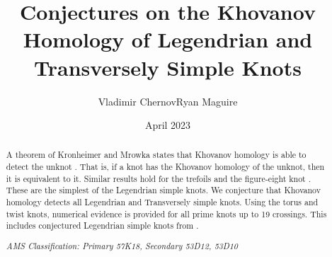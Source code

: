 \documentclass{article}
\title{Conjectures on the Khovanov Homology of Legendrian
       and Transversely Simple Knots}
\author{Vladimir Chernov\hspace{2em}Ryan Maguire}
\date{April 2023}
\theoremstyle{plain}
\begin{document}
    \maketitle
    \tableofcontents
    \begin{abstract}
        \noindent
        A theorem of Kronheimer and Mrowka states that Khovanov homology is
        able to detect the unknot \cite{kronheimermrowka2010}.
        That is, if a knot has the Khovanov homology of the unknot, then it is
        equivalent to it. Similar results hold for the trefoils
        \cite{BaldwinSivekKhovanovTrefoils} and the figure-eight knot
        \cite{BaldwinDowlinKhovanovFigureEight}. These are the
        simplest of the Legendrian simple knots. We conjecture that
        Khovanov homology detects all Legendrian and Transversely simple
        knots. Using the torus and twist knots, numerical evidence is provided
        for all prime knots up to 19 crossings.
        This includes conjectured Legendrian simple knots from
        \cite{LegendrianKnotAtlas}.
        \par\hfill\par
        \textit{AMS Classification: Primary 57K18, Secondary 53D12, 53D10}
    \end{abstract}
\end{document}
